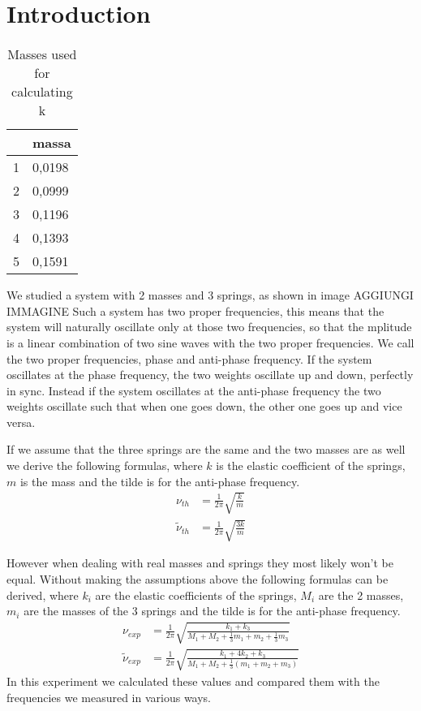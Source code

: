 \documentclass{article}
\begin{document}
\section{Introduction} \label{sec:intro}
\begin{wraptable}{r}{4cm}
    \centering
    \begin{tabular}{|l|l|}
    \hline
         & massa \\ \hline
        1 & 0,0198 \\ \hline
        2 & 0,0999 \\ \hline
        3 & 0,1196 \\ \hline
        4 & 0,1393 \\ \hline
        5 & 0,1591 \\ \hline
    \end{tabular}
    \caption{Masses used for calculating k}
    \label{tab:regm}
\end{wraptable}
We studied a system with 2 masses and 3 springs, as shown in image AGGIUNGI IMMAGINE
Such a system has two proper frequencies, this means that the system will naturally oscillate only at those two frequencies, so that the mplitude is a linear combination of two sine waves with the two proper frequencies. 
We call the two proper frequencies, phase and anti-phase frequency. If the system oscillates at the phase frequency, the two weights oscillate up and down, perfectly in sync. Instead if the system oscillates at the anti-phase frequency the two weights oscillate such that when one goes down, the other one goes up and vice versa. 

If we assume that the three springs are the same and the two masses are as well 
we derive the following formulas, where $k$ is the elastic coefficient of the springs, $m$ is the mass and the tilde is for the anti-phase frequency.
\begin{align}
    \nu_{th} &= \frac{1}{2\pi}   \sqrt{\frac{ k}{m}}
        \label{eq:nuth} \\
    \tilde \nu_{th} &= \frac{1}{2\pi}   \sqrt{\frac{3k}{m}}
        \label{eq:antinuth}
\end{align}

However when dealing with real masses and springs they most 
likely won't be equal. Without making the assumptions above 
the following formulas can be derived, where $k_i$ are the elastic coefficients of the springs, $M_i$ are the 2 masses, $m_i$ are the masses of the 3 springs and the tilde is for the anti-phase frequency.
\begin{align}
           \nu_{exp} &= \frac{1}{2\pi}   \sqrt{\frac{k_1+k_3}
           {M_1 + M_2 + \frac{1}{3} m_1 + m_2 + \frac{1}{3}m_3 }} 
           \label{eq:nuexp}  \\
    \tilde \nu_{exp} &= \frac{1}{2\pi}   \sqrt{\frac{k_1 +4k_2 +k_3}
           {M_1 + M_2 + \frac{1}{3} (m_1 + m_2 + m_3) }} 
           \label{eq:antinuexp} 
\end{align}
In this experiment we calculated these values and compared them with the frequencies we measured in various ways. 
\end{document}
